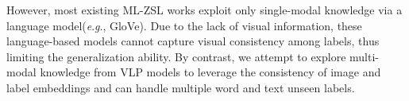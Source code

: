 \documentclass[letterpaper]{article} %
\newcommand{\eg}{\textit{e}.\textit{g}.}
\begin{document}
However, most existing ML-ZSL works exploit only single-modal knowledge via a language model(\eg, GloVe).
Due to the lack of visual information, these language-based models cannot capture visual consistency among labels, thus limiting the generalization ability.
By contrast, we attempt to explore multi-modal knowledge from VLP models to leverage the consistency of image and label embeddings and  can handle multiple word and text unseen labels.
\end{document}
